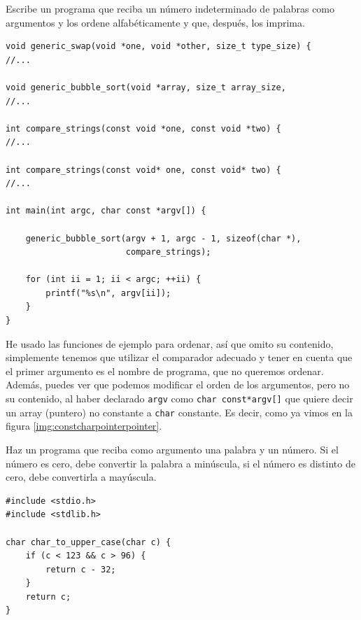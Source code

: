 \documentclass[a4paper]{article}
\begin{document}
\begin{exercises}
\item Escribe un programa que reciba un número indeterminado de palabras como
argumentos y los ordene alfabéticamente y que, después, los imprima.


\noindent
\begin{minipage}[H]{\linewidth}
\mbox{}
\begin{lstlisting}[style=C,
caption={Solución al ejercicio 19},
label={lst:solution19}]
void generic_swap(void *one, void *other, size_t type_size) {
//...

void generic_bubble_sort(void *array, size_t array_size,
//...

int compare_strings(const void *one, const void *two) {
//...

int compare_strings(const void* one, const void* two) {
//...

int main(int argc, char const *argv[]) {

    generic_bubble_sort(argv + 1, argc - 1, sizeof(char *),
                        compare_strings);

    for (int ii = 1; ii < argc; ++ii) {
        printf("%s\n", argv[ii]);
    }
}
\end{lstlisting}
\end{minipage}

He usado las funciones de ejemplo para ordenar, así que omito su contenido,
simplemente tenemos que utilizar el comparador adecuado y tener en cuenta que
el primer argumento es el nombre de programa, que no queremos ordenar. Además,
puedes ver que podemos modificar el orden de los argumentos, pero no su
contenido, al haber declarado \texttt{argv} como \verb!char const*argv[]! que
quiere decir un array (puntero) no constante a \verb!char! constante. Es decir,
como ya vimos en la figura \ref{img:constcharpointerpointer}.


\item Haz un programa que reciba como argumento una palabra y un número. Si el
número es cero, debe convertir la palabra a minúscula, si el número es distinto
de cero, debe convertirla a mayúscula.

\noindent
\begin{minipage}[H]{\linewidth}
\mbox{}
\begin{lstlisting}[style=C,
caption={Solución al ejercicio 20},
label={lst:solution20}]
#include <stdio.h>
#include <stdlib.h>

char char_to_upper_case(char c) {
    if (c < 123 && c > 96) {
        return c - 32;
    }
    return c;
}


\end{lstlisting}
\end{minipage}
\end{exercises}
\end{document}
